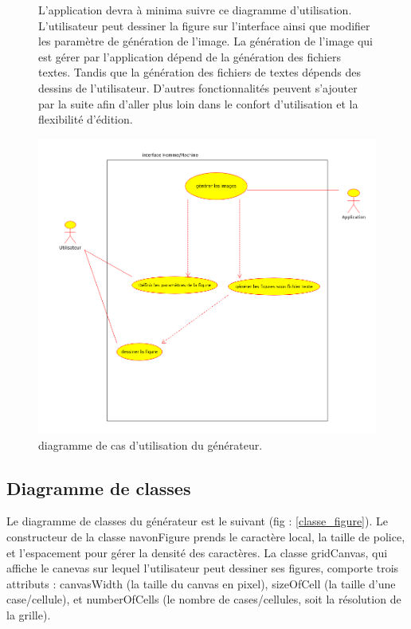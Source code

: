 \documentclass{article}
\begin{document}
	\begin{figure}[!h]
	L'application devra à minima suivre ce diagramme d'utilisation. L'utilisateur peut dessiner la figure sur l'interface ainsi que modifier les paramètre de génération de l'image. La génération de l'image qui est gérer par l'application dépend de la génération des fichiers textes. Tandis que la génération des fichiers de textes dépends des dessins de l'utilisateur. D'autres fonctionnalités peuvent s'ajouter par la suite afin d'aller plus loin dans le confort d'utilisation et la flexibilité d'édition. 
	
		\centering
		\includegraphics[scale=0.35]{./images/diagramme_cas_utilisation.png}
		\caption{diagramme de cas d'utilisation du générateur.}
		\label{fig:utilisation}
	\end{figure}

	\subsection{Diagramme de classes}
	Le diagramme de classes du générateur est le suivant (fig : \ref{classe_figure}). Le constructeur de la classe navonFigure prends le caractère local, la taille de police, et l'espacement pour gérer la densité des caractères. La classe gridCanvas, qui affiche le canevas sur lequel l'utilisateur peut dessiner ses figures, comporte trois attributs : canvasWidth (la taille du canvas en pixel), sizeOfCell (la taille d'une case/cellule), et numberOfCells (le nombre de cases/cellules, soit la résolution de la grille).
\end{document}
